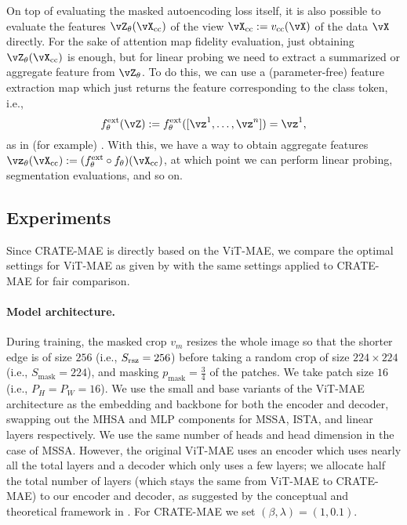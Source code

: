 \documentclass[../../book-main.tex]{subfiles}
\begin{document}
On top of evaluating the masked autoencoding loss itself, it is also possible to evaluate the features \(\vZ_{\theta}(\vX_{\cc})\) of the view \(\vX_{\cc} := v_{\cc}(\vX)\) of the data \(\vX\) directly. For the sake of attention map fidelity evaluation, just obtaining \(\vZ_{\theta}(\vX_{\cc})\) is enough, but for linear probing we need to extract a summarized or aggregate feature from \(\vZ_{\theta}\). To do this, we can use a (parameter-free) feature extraction map which just returns the feature corresponding to the class token, i.e.,
\begin{equation}
    f_{\theta}^{\ext}(\vZ) := f_{\theta}^{\ext}([\vz^{1}, \dots, \vz^{n}]) = \vz^{1},
\end{equation}
as in (for example) . With this, we have a way to obtain aggregate features \(\vz_{\theta}(\vX_{\cc}) := (f_{\theta}^{\ext} \circ f_{\theta})(\vX_{\cc})\), at which point we can perform linear probing, segmentation evaluations, and so on.

\subsection{Experiments}\label{sub:image_completion_experiments}

Since CRATE-MAE is directly based on the ViT-MAE, we compare the optimal settings for ViT-MAE as given by \citep{he2022masked} with the same settings applied to CRATE-MAE for fair comparison.

\paragraph{Model architecture.} During training, the masked crop \(v_{m}\) resizes the whole image so that the shorter edge is of size \(256\) (i.e., \(S_{\mathrm{rsz}} = 256\)) before taking a random crop of size \(224 \times 224\) (i.e., \(S_{\mathrm{mask}} = 224\)), and masking \(p_{\mathrm{mask}} = \frac{3}{4}\) of the patches. We take patch size \(16\) (i.e., \(P_{H} = P_{W} = 16\)). We use the small and base variants of the ViT-MAE architecture as the embedding and backbone for both the encoder and decoder, swapping out the MHSA and MLP components for MSSA, ISTA, and linear layers respectively. We use the same number of heads and head dimension in the case of MSSA. However, the original ViT-MAE uses an encoder which uses nearly all the total layers and a decoder which only uses a few layers; we allocate half the total number of layers (which stays the same from ViT-MAE to CRATE-MAE) to our encoder and decoder, as suggested by the conceptual and theoretical framework in . For CRATE-MAE we set \((\beta, \lambda) = (1, 0.1)\).
\end{document}
